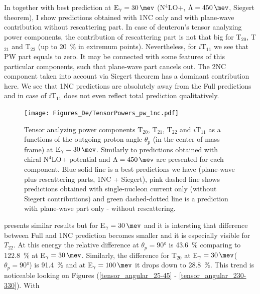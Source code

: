     In  together with best prediction at $\text{E}_\gamma = \SI{30}{\mev}$ (N$^4$LO+, $\Lambda=\SI{450}{\mev}$, Siegert theorem),
    I show predictions obtained with 1NC only and with plane-wave contribution without rescattering part.
    In case of deuteron's tensor analyzing power components, the contribution of rescattering part is not that 
    big for T$_{20}$, T$_{21}$ and T$_{22}$ (up to \SI{20}{\percent} in extremum points). Nevertheless, for
    $i$T$_{11}$ we see that PW part equals to zero. It may be connected with some features of this particular
    components, such that plane-wave part cancels out.
    The 2NC component taken into account via Siegert theorem has a dominant contribution here. We see that 
    1NC predictions are absolutely away from the Full predictions and in case of $i$T$_{11}$
    does not even reflect total prediction qualitatively.

    \begin{figure}[h]
        \begin{center}
        \texttt{[image: Figures\_De/TensorPowers\_pw\_1nc.pdf]}
        \end{center}
        \caption{Tensor analyzing power components T$_{20}$, T$_{21}$, T$_{22}$ and $i$T$_{11}$ as a functions of the
        outgoing proton angle $\theta_p$ (in the center of mass frame) at $\text{E}_\gamma = \SI{30}{\mev}$. Similarly to  predictions obtained with chiral N$^4$LO+ potential and $\Lambda=\SI{450}{\mev}$ are presented for each component.
        Blue solid line is a best predictions we have (plane-wave plus rescattering parts, 1NC + Siegert), pink dashed line shows predictions obtained with
        single-nucleon current only (without Siegert contributions) and green dashed-dotted line
        is a prediction with plane-wave part only - without rescattering.}
        \label{tensor_pw_1nc}
    \end{figure}

     presents similar results but for E$_\gamma = \SI{30}{\mev}$
    and it is intersting that difference between Full and 1NC prediction becomes smaller
    and it is especially visible for $T_{22}$. At this energy the relative difference 
    at $\theta_p = \ang{90}$ is \SI{43.6}{\percent} comparing to \SI{122.8}{\percent}
    at E$_\gamma = \SI{30}{\mev}$. Similarly, the difference for T$_{20}$
    at E$_\gamma = \SI{30}{\mev}$($\theta_p = \ang{90}$) is \SI{91.4}{\percent}
    and at E$_\gamma = \SI{100}{\mev}$ it drops down to \SI{28.8}{\percent}.
    This trend is noticeable looking on Figures (\ref{tensor_angular_25-45} - \ref{tensor_angular_230-330}). With 

